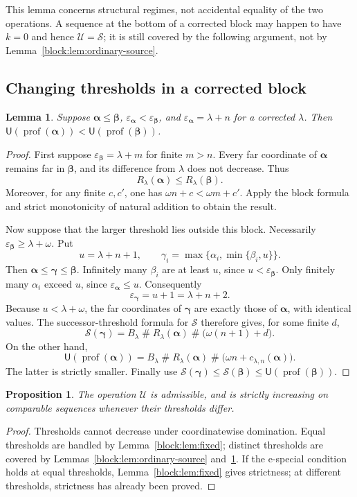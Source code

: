\documentclass[11pt,a4paper]{article}
\newtheorem{lemma}[theorem]{Lemma}
\newtheorem{proposition}[theorem]{Proposition}
\theoremstyle{definition}
\newcommand{\ns}{\mathbin{\#}}
\newcommand{\OpS}{\mathcal S}
\newcommand{\FunU}{\mathsf U}
\newcommand{\prof}{\operatorname{prof}}
\newcommand{\seq}[1]{\boldsymbol{#1}}
\newcommand{\epsa}{\varepsilon_{\seq\alpha}}
\newcommand{\epsb}{\varepsilon_{\seq\beta}}
\begin{document}
This lemma concerns structural regimes, not accidental equality of the two operations. A sequence at the bottom of a corrected block may happen to have $k=0$ and hence $\mathcal U=\OpS$; it is still covered by the following argument, not by Lemma~\ref{block:lem:ordinary-source}.

\subsection{Changing thresholds in a corrected block}

\begin{lemma}\label{block:lem:corrected-source}
Suppose $\seq\alpha\le\seq\beta$, $\epsa<\epsb$, and $\epsa=\lambda+n$ for a corrected $\lambda$. Then $\FunU(\prof(\seq\alpha))<\FunU(\prof(\seq\beta))$.
\end{lemma}
\begin{proof}
First suppose $\epsb=\lambda+m$ for finite $m>n$. Every far coordinate of $\seq\alpha$ remains far in $\seq\beta$, and its difference from $\lambda$ does not decrease. Thus
\[
 R_\lambda(\seq\alpha)\le R_\lambda(\seq\beta).
\]
Moreover, for any finite $c,c'$, one has $\omega n+c<\omega m+c'$. Apply the block formula and strict monotonicity of natural addition to obtain the result.

Now suppose that the larger threshold lies outside this block. Necessarily $\epsb\ge\lambda+\omega$. Put
\[
 u=\lambda+n+1,\qquad
 \gamma_i=\max\{\alpha_i,\min\{\beta_i,u\}\}.
\]
Then $\seq\alpha\le\seq\gamma\le\seq\beta$. Infinitely many $\beta_i$ are at least $u$, since $u<\epsb$. Only finitely many $\alpha_i$ exceed $u$, since $\epsa\le u$. Consequently
\[
 \varepsilon_{\seq\gamma}=u+1=\lambda+n+2.
\]
Because $u<\lambda+\omega$, the far coordinates of $\seq\gamma$ are exactly those of $\seq\alpha$, with identical values. The successor-threshold formula for $\OpS$ therefore gives, for some finite $d$,
\[
 \OpS(\seq\gamma)=B_\lambda\ns R_\lambda(\seq\alpha)
                   \ns\bigl(\omega(n+1)+d\bigr).
\]
On the other hand,
\[
 \FunU(\prof(\seq\alpha))=B_\lambda\ns R_\lambda(\seq\alpha)
                   \ns\bigl(\omega n+c_{\lambda,n}(\seq\alpha)\bigr).
\]
The latter is strictly smaller. Finally use
$\OpS(\seq\gamma)\le\OpS(\seq\beta)\le\FunU(\prof(\seq\beta))$.
\end{proof}

\begin{proposition}\label{block:prop:admissible}
The operation $\mathcal U$ is admissible, and is strictly increasing on comparable sequences whenever their thresholds differ.
\end{proposition}
\begin{proof}
Thresholds cannot decrease under coordinatewise domination. Equal thresholds are handled by Lemma~\ref{block:lem:fixed}; distinct thresholds are covered by Lemmas~\ref{block:lem:ordinary-source} and~\ref{block:lem:corrected-source}. If the e-special condition holds at equal thresholds, Lemma~\ref{block:lem:fixed} gives strictness; at different thresholds, strictness has already been proved.
\end{proof}
\end{document}
